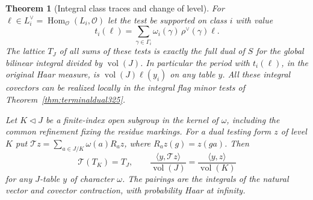 \documentclass[a4paper,11pt]{article}
\newtheorem{theorem}[proposition]{Theorem}
\theoremstyle{definition}
\theoremstyle{remark}
\numberwithin{equation}{section}
\begin{document}
\begin{theorem}[Integral class traces and change of level]\leavevmode
\label{thm:classtrace326}
For \(\ell\in L_i^\vee=\operatorname{Hom}_{\mathcal O}(L_i,\mathcal O)\)
let the test be supported on class \(i\) with value
\[
       t_i(\ell)=\sum_{\gamma\in\Gamma_i}
                        \omega_i(\gamma)\,\rho^\vee(\gamma)\ell .
\]
The lattice \(T_J\) of all sums of these tests is exactly
the full dual of \(S\) for the global bilinear integral
divided by \(\operatorname{vol}(J)\). In particular the
period with \(t_i(\ell)\), in the original Haar measure,
is \(\operatorname{vol}(J)\ell(y_i)\) on any table \(y\).
All these integral covectors can be realized locally in the
integral flag minor tests of Theorem~\ref{thm:terminaldual325}.

Let \(K\triangleleft J\) be a finite-index open subgroup
in the kernel of \(\omega\), including the common refinement
fixing the residue markings. For a dual testing form
\(z\) of level \(K\) put
\(\mathcal Tz=\sum_{a\in J/K}\omega(a)R_a z\),
where \(R_a z(g)=z(ga)\). Then
\[
  \mathcal T(T_K)=T_J,\qquad
  \frac{\langle y,\mathcal Tz\rangle}{\operatorname{vol}(J)}
       =\frac{\langle y,z\rangle}{\operatorname{vol}(K)}
\]
for any \(J\)-table \(y\) of character \(\omega\). The
pairings are the integrals of the natural vector and
covector contraction, with probability Haar at infinity.
\end{theorem}
\end{document}
